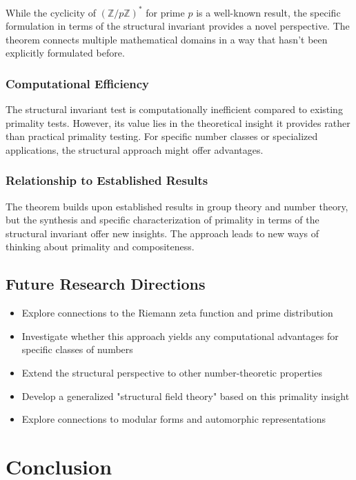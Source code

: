\documentclass[11pt,a4paper]{article}
\newcommand{\Z}{\mathbb{Z}}
\newcommand{\ZnZstar}[1]{(\Z/{#1}\Z)^{*}}
\begin{document}
While the cyclicity of $\ZnZstar{p}$ for prime $p$ is a well-known result, the specific formulation in terms of the structural invariant provides a novel perspective. The theorem connects multiple mathematical domains in a way that hasn't been explicitly formulated before.

\subsubsection{Computational Efficiency}

The structural invariant test is computationally inefficient compared to existing primality tests. However, its value lies in the theoretical insight it provides rather than practical primality testing. For specific number classes or specialized applications, the structural approach might offer advantages.

\subsubsection{Relationship to Established Results}

The theorem builds upon established results in group theory and number theory, but the synthesis and specific characterization of primality in terms of the structural invariant offer new insights. The approach leads to new ways of thinking about primality and compositeness.

\subsection{Future Research Directions}

\begin{itemize}
    \item Explore connections to the Riemann zeta function and prime distribution
    \item Investigate whether this approach yields any computational advantages for specific classes of numbers
    \item Extend the structural perspective to other number-theoretic properties
    \item Develop a generalized "structural field theory" based on this primality insight
    \item Explore connections to modular forms and automorphic representations
\end{itemize}

\section{Conclusion}
\end{document}
